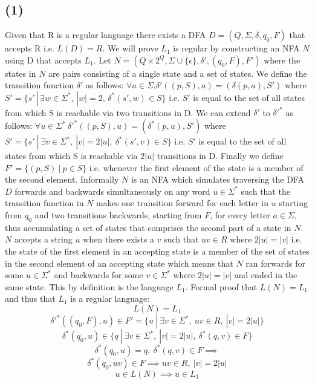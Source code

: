 \documentclass[12pt]{article}
\begin{document}
\subsection*{(1)}
  Given that R is a regular language there exists a DFA
  $D = (Q, \Sigma, \delta, q_0, F)$ that accepts R i.e. $L(D) = R$.
  We will prove $L_1$ is regular by constructing
  an NFA $N$ using D that accepts $L_1$. Let $N = (Q \times 2^Q,
  \Sigma \cup \{\epsilon\}, \delta{'}, (q_0 , F), F')$ where the states in $N$
  are pairs consisting of a single state and a set of states. We define the
  transition function $\delta{'}$ as follows:
  \newline
  \indent $\forall a \in \Sigma$,\:$\delta{'}((p,S), a) = (\delta(p,a), S')$ where
  $S'= \{s'\,|\,\exists w \in \Sigma^*,\,|w| = 2,\, \delta^*(s',w) \in S\}$
  \newline
  \indent i.e. $S'$ is equal to the set of all states from which S is reachable
  via two transitions in D.
  \newline
  We can extend $\delta{'}$ to $\delta{'}^*$ as follows:
  \newline
  \indent $\forall u \in \Sigma^*\: \delta{'}^* ((p,S),u) = (\delta^* (p, u),S')$
  where $S' = \{s'\:|\:\exists v \in \Sigma^* ,\: |v|=2|u| ,\:
  \delta^* (s', v) \in S\}$
  \newline
  \indent i.e. $S'$ is equal to the set of all states from which S is reachable
  via $2|u|$ transitions in D.
  \newline
  Finally we define $F' = \{(p, S) \:|\: p \in S\}$ i.e. whenever the first element
  of the state is a member of the second element. Informally $N$ is an NFA which
  simulates traversing the DFA $D$ forwards and backwards simultaneously on any
  word $u \in \Sigma^*$ such that the transition function in $N$ makes one
  transition forward for each letter in $u$ starting from $q_0$ and two
  transitions backwards, starting from $F$, for every letter $a \in \Sigma$, thus
  accumulating a set of states that comprises the second part of a state in $N$.
  $N$ accepts a string $u$ when there exists a $v$ such that $uv \in R$ where
  $2|u| = |v|$ i.e. the state of the first element in an accepting state
  is a member of the set of states in the second element of an accepting state
  which means that $N$ ran forwards for some $u \in \Sigma^*$ and backwards for
  some $v \in \Sigma^*$ where $2|u| = |v|$ and ended in the same state.
  This by definition is the language $L_1$. Formal proof that $L(N) = L_1$ and
  thus that $L_1$ is a regular language:
  $$ L(N) = L_1 $$
  $$ \delta{'}^*((q_0, F), u) \in F' = \{u \:|\: \exists v \in \Sigma^* ,\:
  uv \in R ,\: |v| = 2|u|\}$$ 
  $$ \delta^*(q_0, u) \in \{q \:|\: \exists v \in \Sigma^* ,\:
  |v| = 2|u| ,\: \delta^*(q,v) \in F\}$$
  $$ \delta^*(q_0, u) = q ,\: \delta^*(q,v) \in F \implies$$
  $$\delta^*(q_0, uv) \in F \implies uv \in R ,\: |v| = 2|u|$$
  $$ u \in L(N) \implies u \in L_1$$
\end{document}
